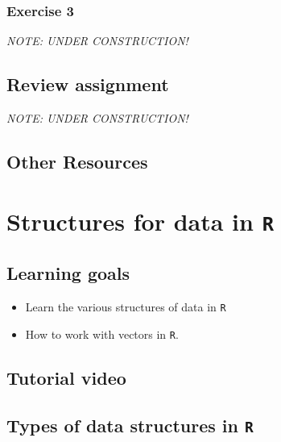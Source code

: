 \documentclass[
]{book}
\providecommand{\tightlist}{%
  \setlength{\itemsep}{0pt}\setlength{\parskip}{0pt}}
\begin{document}
\hypertarget{exercise-3-1}{%
\subsection*{Exercise 3}\label{exercise-3-1}}

\emph{NOTE: UNDER CONSTRUCTION!}

\hypertarget{review-assignment-1}{%
\section*{Review assignment}\label{review-assignment-1}}

\emph{NOTE: UNDER CONSTRUCTION!}

\hypertarget{other-resources-2}{%
\section*{Other Resources}\label{other-resources-2}}

\hypertarget{structures-for-data-in-r}{%
\chapter{\texorpdfstring{Structures for data in \texttt{R}}{Structures for data in R}}\label{structures-for-data-in-r}}

\hypertarget{learning-goals-3}{%
\section*{Learning goals}\label{learning-goals-3}}

\begin{itemize}
\tightlist
\item
  Learn the various structures of data in \texttt{R}\\
\item
  How to work with vectors in \texttt{R}.
\end{itemize}

\hypertarget{tutorial-video-3}{%
\section*{Tutorial video}\label{tutorial-video-3}}

\hypertarget{types-of-data-structures-in-r}{%
\section*{\texorpdfstring{Types of data structures in \texttt{R}}{Types of data structures in R}}\label{types-of-data-structures-in-r}}
\end{document}
